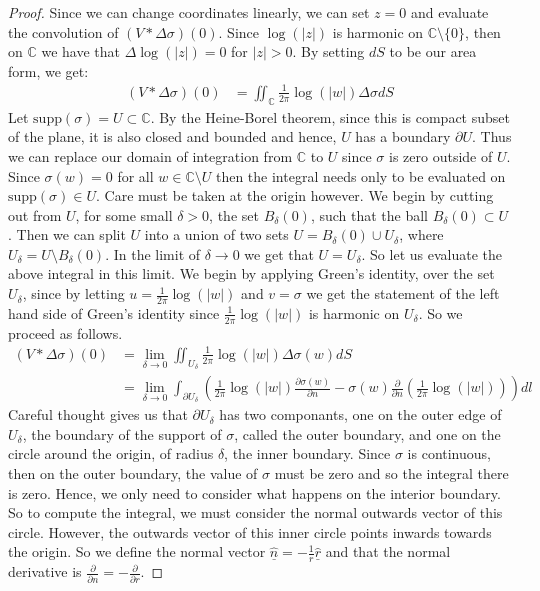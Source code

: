 \documentclass[11pt]{report}
\theoremstyle{definition}
\begin{document}
\begin{proof}
  Since we can change coordinates linearly, we can set $z=0$ and evaluate the convolution of $(V * \Delta \sigma)(0)$. Since $\log(|z|)$ is harmonic on $\mathbb{C}\setminus \{0\}$, then on $\mathbb{C}$ we have that $\Delta \log(|z|) = 0$ for $\vert z \vert > 0$. By setting $dS$ to be our area form, we get:
  \begin{align*}
    (V * \Delta \sigma)(0) &= \iint_{\mathbb{C}}\frac{1}{2\pi}\log(|w|)\Delta \sigma dS
  \end{align*}
  Let $\text{supp}(\sigma) = U \subset \mathbb{C}$. By the Heine-Borel theorem, since this is compact subset of the plane, it is also closed and bounded and hence, $U$ has a boundary $\partial U$. Thus we can replace our domain of integration from $\mathbb{C}$ to $U$ since $\sigma$ is zero outside of $U$. Since $\sigma(w) = 0$ for all $w \in \mathbb{C}\setminus U$ then the integral needs only to be evaluated on $\text{supp}(\sigma) \in U$. Care must be taken at the origin however. We begin by cutting out from $U$, for some small $\delta >0$, the set $B_{\delta}(0)$, such that the ball $B_{\delta}(0) \subset U$. Then we can split $U$ into a union of two sets $U=B_{\delta}(0) \cup U_{\delta}$, where $U_{\delta} = U\setminus B_{\delta}(0)$. In the limit of $\delta \rightarrow 0$ we get that $U=U_{\delta}$. So let us evaluate the above integral in this limit.
  We begin by applying Green's identity, over the set $U_{\delta}$, since by letting $u = \frac{1}{2\pi}\log(|w|)$ and $v = \sigma$ we get the statement of the left hand side of Green's identity since $\frac{1}{2\pi}\log(|w|)$ is harmonic on $U_{\delta}$. So we proceed as follows.
  \begin{align*}
    (V * \Delta \sigma)(0) &= \lim_{\delta \rightarrow 0} \iint_{U_{\delta}} \frac{1}{2\pi}\log(|w|)\Delta\sigma(w) dS \\
    &= \lim_{\delta \rightarrow 0} \int_{\partial U_{\delta}}\left(\frac{1}{2\pi}\log(|w|)\frac{\partial \sigma(w)}{\partial n} - \sigma(w)\frac{\partial}{\partial n}\left(\frac{1}{2\pi}\log(|w|)\right)\right)dl
  \end{align*}
  Careful thought gives us that $\partial U_{\delta}$ has two componants, one on the outer edge of $U_{\delta}$, the boundary of the support of $\sigma$, called the outer boundary, and one on the circle around the origin, of radius $\delta$, the inner boundary. Since $\sigma$ is continuous, then on the outer boundary, the value of $\sigma$ must be zero and so the integral there is zero. Hence, we only need to consider what happens on the interior boundary. So to compute the integral, we must consider the normal outwards vector of this circle. However, the outwards vector of this inner circle points inwards towards the origin. So we define the normal vector $\hat{\underline{n}}= -\frac{1}{r}\hat{\underline{r}}$ and that the normal derivative is $\frac{\partial}{\partial n} = -\frac{\partial}{\partial r}$.

\end{proof}
\end{document}
